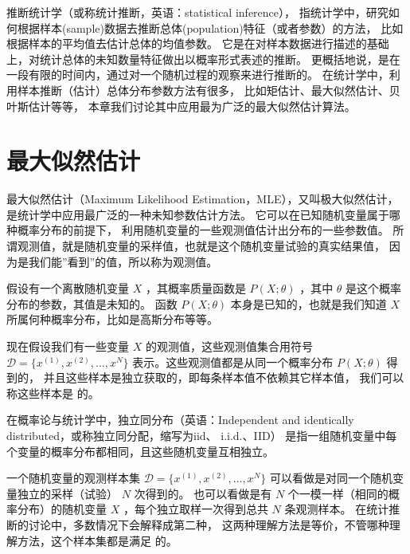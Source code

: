 \documentclass[letterpaper,10pt,english]{sphinxmanual}
\begin{document}
推断统计学（或称统计推断，英语：statistical inference），
指统计学中，研究如何根据样本(sample)数据去推断总体(population)特征（或者参数）的方法，
比如根据样本的平均值去估计总体的均值参数。
它是在对样本数据进行描述的基础上，对统计总体的未知数量特征做出以概率形式表述的推断。
更概括地说，是在一段有限的时间内，通过对一个随机过程的观察来进行推断的。
在统计学中，利用样本推断（估计）总体分布参数方法有很多，
比如矩估计、最大似然估计、贝叶斯估计等等，
本章我们讨论其中应用最为广泛的最大似然估计算法。


\section{最大似然估计}
\label{\detokenize{_u6700_u5927_u4f3c_u7136_u4f30_u8ba1/content:ch-liklihood}}\label{\detokenize{_u6700_u5927_u4f3c_u7136_u4f30_u8ba1/content:id2}}
最大似然估计（Maximum Likelihood Estimation，MLE），又叫极大似然估计，是统计学中应用最广泛的一种未知参数估计方法。
它可以在已知随机变量属于哪种概率分布的前提下，
利用随机变量的一些观测值估计出分布的一些参数值。
所谓观测值，就是随机变量的采样值，也就是这个随机变量试验的真实结果值，
因为是我们能”看到”的值，所以称为观测值。

假设有一个离散随机变量 \(X\) ，其概率质量函数是 \(P(X;\theta)\)
，其中 \(\theta\) 是这个概率分布的参数，其值是未知的。
函数 \(P(X;\theta)\) 本身是已知的，也就是我们知道  \(X\) 所属何种概率分布，比如是高斯分布等等。

现在假设我们有一些变量 \(X\) 的观测值，这些观测值集合用符号
\(\mathcal{D}=\{x^{(1)},x^{(2)},\ldots,x^{N}\}\)
表示。这些观测值都是从同一个概率分布 \(P(X;\theta)\) 得到的，
并且这些样本是独立获取的，即每条样本值不依赖其它样本值，
我们可以称这些样本是  的。

\begin{sphinxShadowBox}

在概率论与统计学中，独立同分布（英语：Independent and identically distributed，或称独立同分配，缩写为iid、 i.i.d.、IID）
是指一组随机变量中每个变量的概率分布都相同，且这些随机变量互相独立。
\end{sphinxShadowBox}

\begin{sphinxShadowBox}

一个随机变量的观测样本集 \(\mathcal{D}=\{x^{(1)},x^{(2)},\ldots,x^{N}\}\)
可以看做是对同一个随机变量独立的采样（试验） \(N\) 次得到的。
也可以看做是有 \(N\) 个一模一样（相同的概率分布）的随机变量 \(X\)
，每个独立取样一次得到总共 \(N\) 条观测样本。
在统计推断的讨论中，多数情况下会解释成第二种，
这两种理解方法是等价，不管哪种理解方法，这个样本集都是满足  的。
\end{sphinxShadowBox}
\end{document}

